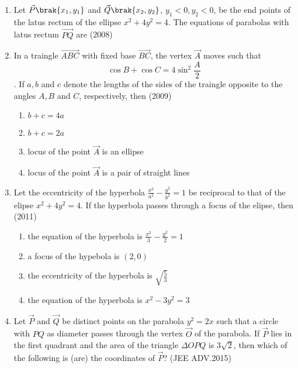\begin{enumerate}
\item Let $\vec{P}\brak{x_{1}, y_{1}}$ and $\vec{Q}\brak{x_{2},y_{2}}$, $y_{1}<0,y_{2}<0$, be the end points of the latus rectum of the ellipse $x^2+4y^2=4$. The equations of parabolas with latus rectum $\vec{PQ}$ are \hfill(2008)\\
	\begin{enumerate}
	\end{enumerate}

\item In a traingle $\vec{ABC}$ with fixed base $\vec{BC}$, the vertex $\vec{A}$ moves such that
	$$\cos{B}+\cos{C}=4\sin^2{\frac{A}{2}}$$.
		If $a,b$ and $c$ denote the lengths of the sides of the traingle opposite to the angles $A,B$ and $C$, respectively, then \hfill(2009)\\
		\begin{enumerate}
			\item $b+c=4a$
			\item $b+c=2a$
			\item locus of the point $\vec{A}$ is an ellipse
			\item locus of the point $\vec{A}$ is a pair of straight lines
		\end{enumerate}

	\item Let the eccentricity of the hyperbola $\frac{x^2}{a^2}-\frac{y^2}{b^2}=1$ be reciprocal to that of the elipse $x^2+4y^2=4$. If the hyperbola
	passes through a focus of the elipse, then 
		\hfill(2011)
		
		 \begin{enumerate}
			\item the equation of the hyperbola is $\frac{x^2}{3}-\frac{y^2}{2}=1$
			\item a focus of the hypebola is $(2,0)$
			\item the eccentricity of the hyperbola is $\sqrt{\frac{5}{3}}$
			\item the equation of the hyperbola is $x^2-3y^2=3$
		 \end{enumerate}
	\item Let $\vec{P}$ and $\vec{Q}$ be distinct points on the parabola $y^2=2x$ such 
		that a circle with $PQ$ as diameter passes through the vertex
		$\vec{O}$ of the parabola. If $\vec{P}$ lies in the first quadrant and the area
		of the triangle  \(\Delta \)$OPQ$ is 3$\sqrt{2}$, then which of the following is
		(are) the coordinates of $\vec{P}$?  
		\hfill(JEE ADV.2015)
		

\end{enumerate}
